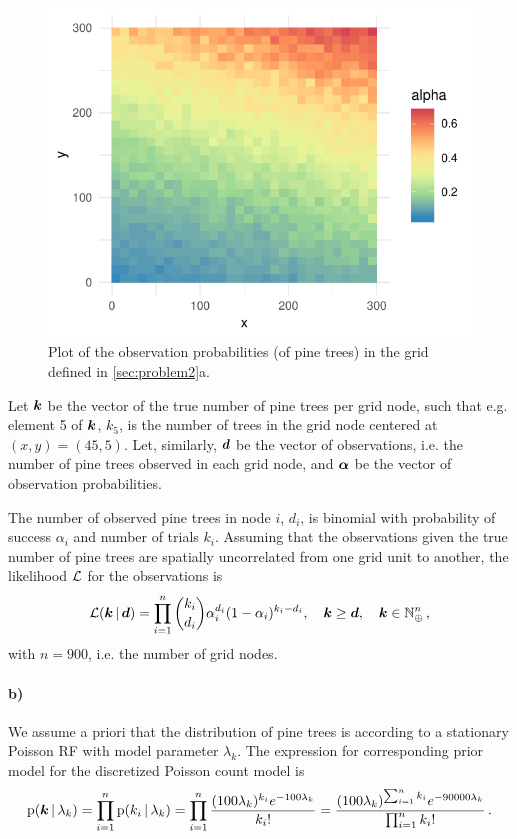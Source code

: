 \begin{figure}
    \centering
    \includegraphics{figures/p2_alpha.pdf}
    \caption{Plot of the observation probabilities (of pine trees) in the grid defined in \ref{sec:problem2}a.}
    \label{fig:p2_alpha}
\end{figure}

Let $\bm{k}$ be the vector of the true number of pine trees per grid node, such that e.g. element 5 of $\bm{k}$, $k_5$, is the number of trees in the grid node centered at $(x, y) = (45, 5)$. Let, similarly, $\bm{d}$ be the vector of observations, i.e. the number of pine trees observed in each grid node, and $\bm{\alpha}$ be the vector of observation probabilities.

The number of observed pine trees in node $i$, $d_i$, is binomial with probability of success $\alpha_i$ and number of trials $k_i$. Assuming that the observations given the true number of pine trees are spatially uncorrelated from one grid unit to another, the likelihood $\mathcal{L}$ for the observations is
%
\begin{equation*}
    \mathcal{L}(\bm{k} \, | \, \bm{d}) = \prod_{i=1}^n \binom{k_i}{d_i} \alpha_i^{d_i} (1 - \alpha_i)^{k_i - d_i}, \quad \bm{k} \geq \bm{d}, \quad \bm{k} \in \mathbb{N}_\oplus^n \, ,
\end{equation*}
%
with $n=900$, i.e. the number of grid nodes.

\paragraph{b)}
We assume a priori that the distribution of pine trees is according to a stationary Poisson RF with model parameter $\lambda_k$. The expression for corresponding prior model for the discretized Poisson count model is
%
\begin{equation*}
    \mathrm{p}(\bm{k} \, | \, \lambda_k) = \prod_{i=1}^n \mathrm{p}(k_i \, | \, \lambda_k) = \prod_{i=1}^n \frac{(100\lambda_k)^{k_i} e^{-100\lambda_k}}{k_i!} = \frac{(100\lambda_k)^{\sum_{i=1}^n k_i} e^{-90000\lambda_k}}{\prod_{i=1}^n k_i!} \, .
\end{equation*}

